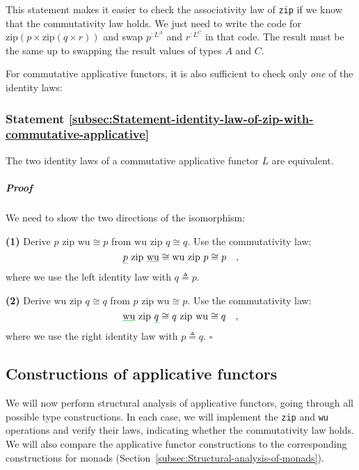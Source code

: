 This statement makes it easier to check the associativity law of \lstinline!zip!
if we know that the commutativity law holds. We just need to write
the code for $\text{zip}\left(p\times\text{zip}\left(q\times r\right)\right)$
and swap $p^{:L^{A}}$ and $r^{:L^{C}}$ in that code. The result
must be the same up to swapping the result values of types $A$ and
$C$.

For commutative applicative functors, it is also sufficient to check
only \emph{one} of the identity laws:

\subsubsection{Statement \label{subsec:Statement-identity-law-of-zip-with-commutative-applicative}\ref{subsec:Statement-identity-law-of-zip-with-commutative-applicative}}

The two identity laws of a commutative applicative functor $L$ are
equivalent.

\subparagraph{Proof}

We need to show the two directions of the isomorphism: 

\textbf{(1)} Derive $p\,\,\text{zip}\,\,\text{wu}\cong p$ from $\text{wu}\,\,\text{zip}\,\,q\cong q$.
Use the commutativity law:
\[
\gunderline p\,\,\text{zip}\,\,\gunderline{\text{wu}}\cong\text{wu}\,\,\text{zip}\,\,p\cong p\quad,
\]
where we use the left identity law with $q\triangleq p$.

\textbf{(2)} Derive $\text{wu}\,\,\text{zip}\,\,q\cong q$ from $p\,\,\text{zip}\,\,\text{wu}\cong p$.
Use the commutativity law:
\[
\gunderline{\text{wu}}\,\,\text{zip}\,\,\gunderline q\cong q\,\,\text{zip}\,\,\text{wu}\cong q\quad,
\]
where we use the right identity law with $p\triangleq q$. $\square$

\subsection{Constructions of applicative functors\label{subsec:Constructions-of-applicative-functors}}

We will now perform structural analysis of applicative functors, going
through all possible type constructions. In each case, we will implement
the \lstinline!zip! and \lstinline!wu! operations and verify their
laws, indicating whether the commutativity law holds. We will also
compare the applicative functor constructions to the corresponding
constructions for monads (Section~\ref{subsec:Structural-analysis-of-monads}).

